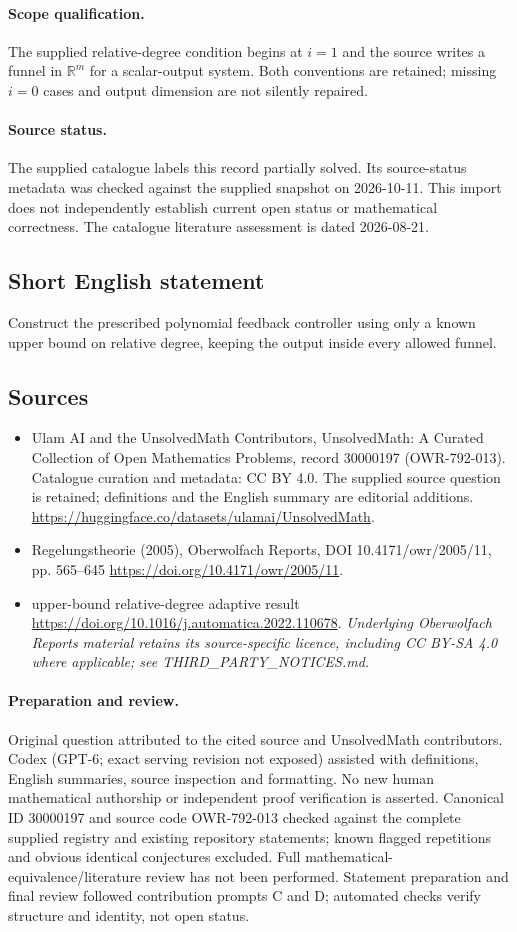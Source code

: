 \documentclass[11pt]{article}
\begin{document}
\paragraph{Scope qualification.}
The supplied relative-degree condition begins at $i=1$ and the source writes a funnel in $\mathbb R^m$ for a scalar-output system. Both conventions are retained; missing $i=0$ cases and output dimension are not silently repaired.
\paragraph{Source status.}
The supplied catalogue labels this record partially solved. Its source-status metadata was checked against the supplied snapshot on 2026-10-11. This import does not independently establish current open status or mathematical correctness. The catalogue literature assessment is dated 2026-08-21.
\subsection{Short English statement}
Construct the prescribed polynomial feedback controller using only a known upper bound on relative degree, keeping the output inside every allowed funnel.
\subsection{Sources}
\begin{itemize}
\item[S1] Ulam AI and the UnsolvedMath Contributors, UnsolvedMath: A Curated Collection of Open Mathematics Problems, record 30000197 (OWR-792-013). Catalogue curation and metadata: CC BY 4.0. The supplied source question is retained; definitions and the English summary are editorial additions.
\url{https://huggingface.co/datasets/ulamai/UnsolvedMath}.
\item[S2] Regelungstheorie (2005), Oberwolfach Reports, DOI 10.4171/owr/2005/11, pp. 565--645
\url{https://doi.org/10.4171/owr/2005/11}.
\item[S3] upper-bound relative-degree adaptive result
\url{https://doi.org/10.1016/j.automatica.2022.110678}.
\textit{Underlying Oberwolfach Reports material retains its source-specific licence, including CC BY-SA 4.0 where applicable; see THIRD\_PARTY\_NOTICES.md.}
\end{itemize}
\paragraph{Preparation and review.}
Original question attributed to the cited source and UnsolvedMath contributors. Codex (GPT-6; exact serving revision not exposed) assisted with definitions, English summaries, source inspection and formatting. No new human mathematical authorship or independent proof verification is asserted. Canonical ID 30000197 and source code OWR-792-013 checked against the complete supplied registry and existing repository statements; known flagged repetitions and obvious identical conjectures excluded. Full mathematical-equivalence/literature review has not been performed. Statement preparation and final review followed contribution prompts C and D; automated checks verify structure and identity, not open status.
\label{end:30000197}
\end{document}
